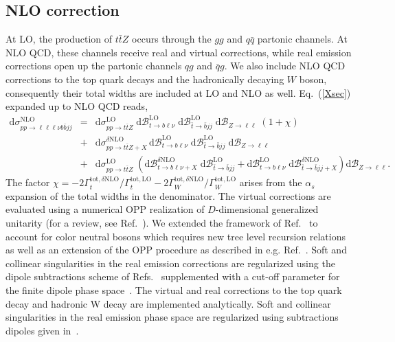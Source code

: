 \documentclass[preprint]{JHEP3} %
\newcommand{\mrm}{\mathrm}
\newcommand{\rd}{\mathrm{d}}
\newcommand{\Br}{\mathcal{B}}
\def\ttbZ{t\bar{t}Z}
\newcommand{\be}{\begin{eqnarray}}
\newcommand{\ee}{\end{eqnarray}}
\begin{document}
\subsection{NLO correction}
At LO, the production of $\ttbZ$ occurs through the $gg$ and $q\bar{q}$ partonic channels. 
At NLO QCD, these channels receive real and virtual corrections, while real emission corrections open up the partonic channels $qg$ and $\bar{q}g$. 
We also include NLO QCD corrections to the top quark decays and the hadronically decaying $W$ boson, consequently their total widths are included at LO and NLO as well.
Eq.~(\ref{Xsec}) expanded up to NLO QCD reads,
\be
 \rd \sigma_{pp\to\ell\ell\ell\nu b \bar{b} jj}^\mrm{NLO} &=& 
 \rd \sigma_{pp\to\ttbZ}^\mrm{LO} \; \rd\Br_{t\to b \ell\nu}^\mrm{LO} \; \rd\Br_{\bar{t} \to \bar{b} jj}^\mrm{LO} \; \rd\Br_{Z\to \ell\ell}
 \; \left( 1 + \chi \right)
\nonumber \\
 &+&   \rd \sigma_{pp\to\ttbZ+X}^{\delta \mrm{NLO}}  \, \rd\Br_{t\to b \ell\nu}^\mrm{LO} \; \rd\Br_{\bar{t} \to \bar{b} jj}^\mrm{LO} \; \rd\Br_{Z\to \ell\ell}
\nonumber \\
 &+&  \rd \sigma_{pp\to\ttbZ}^\mrm{LO} \; \left(  \rd\Br_{t\to b \ell\nu+X}^{\delta\mrm{NLO}} \; \rd\Br_{\bar{t} \to \bar{b} jj}^\mrm{LO} + \rd\Br_{t\to b \ell\nu}^\mrm{LO} \; \rd\Br_{\bar{t} \to \bar{b} jj+X}^{\delta\mrm{NLO}} \right) \rd\Br_{Z\to \ell\ell}
. \label{XsecNLO}
\ee
The factor $\chi= -2 \Gamma_t^{\mrm{tot},\delta\mrm{NLO}}/\Gamma_t^{\mrm{tot,LO}} -2 \Gamma_W^{\mrm{tot},\delta\mrm{NLO}}/\Gamma_W^{\mrm{tot,LO}} $ arises from the $\alpha_s$ expansion
of the total widths in the denominator.
The virtual corrections are evaluated using a numerical OPP realization \cite{Ossola:2006} of $D$-dimensional generalized unitarity \cite{Ellis:2007br,Giele:2008ve,Ellis:2008ir} (for a review, see Ref.~\cite{Ellis:2011}).
We extended the framework of Ref.~\cite{Melnikov:2009dn} to account for color neutral bosons which requires new tree level recursion relations as well as an extension of the OPP procedure as described in e.g. Ref.~\cite{}.
Soft and collinear singularities in the real emission corrections are regularized using the dipole subtractions scheme of Refs.~\cite{Catani:1996vz,Catani:2002hc} supplemented with a cut-off parameter for the
finite dipole phase space~\cite{Nagy:2003tz,Nagy:2003tz,copy from ttbphoton paper}.
The virtual and real corrections to the top quark decay and hadronic W decay are implemented analytically. Soft and collinear singularities in the real emission phase space are regularized using subtractions dipoles given in~\cite{see ttbphoton paper}.
\end{document}
